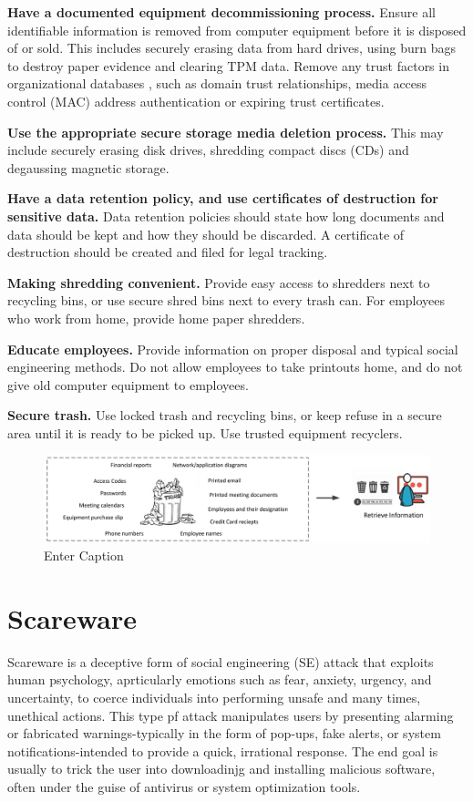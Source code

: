 {\textbf{Have a documented equipment decommissioning process.} Ensure all identifiable information is removed from computer equipment before it is disposed of or sold. This includes securely erasing data from hard drives, using burn bags to destroy paper evidence and clearing TPM data. Remove any trust factors in organizational databases , such as domain trust relationships, media access control (MAC) address authentication or expiring trust certificates.

\textbf{Use the appropriate secure storage media deletion process.} This may include securely erasing disk drives, shredding compact discs (CDs) and degaussing magnetic storage.

\textbf{Have a data retention policy, and use certificates of destruction for sensitive data.} Data retention policies should state how long documents and data should be kept and how they should be discarded. A certificate of destruction should be created and filed for legal tracking.

\textbf{Making shredding convenient.} Provide easy access to shredders next to recycling bins, or use secure shred bins next to every trash can. For employees who work from home, provide home paper shredders.

\textbf{Educate employees.} Provide information on proper disposal and typical social engineering methods. Do not allow employees to take printouts home, and do not give old computer equipment to employees.

\textbf{Secure trash.} Use locked trash and recycling bins, or keep refuse in a secure area until it is ready to be picked up. Use trusted equipment recyclers.

\begin{figure}
    \centering
    \includegraphics[width=0.75\linewidth]{dumpsterdive.png}
    \caption{Enter Caption}
    \label{fig:placeholder}
\end{figure}

\section{Scareware}
Scareware is a deceptive form of social engineering (SE) attack that exploits human psychology, aprticularly emotions such as fear, anxiety, urgency, and uncertainty, to coerce individuals into performing unsafe and many times, unethical actions. This type pf attack manipulates users by presenting alarming or fabricated warnings-typically in the form of pop-ups, fake alerts, or system notifications-intended to provide a quick, irrational response. The end goal is usually to trick the user into downloadinjg and installing malicious software, often under the guise of antivirus or system optimization tools.

}
